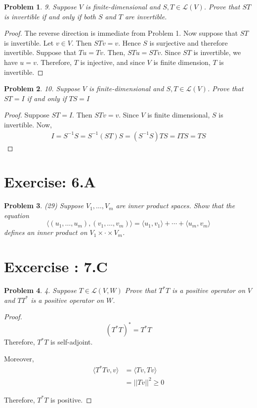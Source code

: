\documentclass[12pt]{book}
\newtheorem*{problem*}{Problem}
\newcommand{\LL}{\mathcal{L}}
\begin{document}
\begin{problem*}9. Suppose $V$ is finite-dimensional and $S,T \in \LL(V)$. Prove that $ST$ is invertible if and only if both $S$ and $T$ are invertible.\end{problem*}

\begin{proof}
  The reverse direction is immediate from Problem 1. Now suppose that $ST$ is invertible. Let $v \in V$. Then $STv = v$. Hence $S$ is surjective and therefore invertible. Suppose that $Tu = Tv$. Then, $ST u = ST v$. Since $ST$ is invertible, we have $u = v$. Therefore, $T$ is injective, and since $V$ is finite dimension, $T$ is invertible. 
\end{proof}

\begin{problem*}10. Suppose $V$ is finite-dimensional and $S, T \in \LL(V)$. Prove that $ST = I$ if and only if $TS = I$\end{problem*}

\begin{proof}
  Suppose $ST = I$. Then $STv = v$. Since $V$ is finite dimensional, $S$ is invertible. Now,
  \begin{align*}
    I = S^{-1}S = S^{-1}(ST)S = (S^{-1}S)TS = ITS = TS
  \end{align*}
\end{proof}

\section{Exercise: 6.A}
\begin{problem*}
  (29) Suppose $V_1, \ldots, V_m$ are inner product spaces. Show that the equation 
  \[
  \langle(u_1, \ldots, u_m), (v_1, \ldots, v_m) \rangle = \langle u_1, v_1\rangle + \cdots + \langle u_m, v_m\rangle
  \]
  defines an inner product on $V_1 \times \cdot \times V_m$.
\end{problem*}


\section{Excercise : 7.C}

\begin{problem*}
4. Suppose $T \in \LL(V,W)$ Prove that $T^*T$ is a positive operator on $V$ and $TT^*$ is a positive operator on $W$. 
\end{problem*}

\begin{proof}
  \[
  (T^{*}T)^* = T^*T
  \]
  Therefore, $T^{*}T$ is self-adjoint.

  Moreover,
  \begin{align*}
    \langle T^{*}Tv, v \rangle & = \langle Tv, Tv \rangle\\
    & = ||Tv||^2 \ge 0
  \end{align*}

Therefore, $T^{*}T$ is positive. 
\end{proof}


\end{document}
